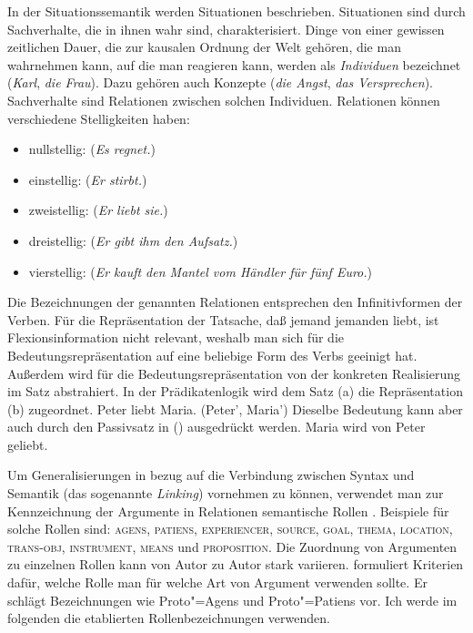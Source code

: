 In der Situationssemantik werden Situationen beschrieben.
Situationen sind durch Sachverhalte, die in ihnen wahr sind, charakterisiert.
Dinge von einer gewissen zeitlichen Dauer, die zur kausalen Ordnung der
Welt gehören, die man wahrnehmen kann, auf die man reagieren kann,
werden als \emph{Individuen} bezeichnet (\emph{Karl}, \emph{die Frau}).
Dazu gehören auch Konzepte (\emph{die Angst}, \emph{das Versprechen}).
Sachverhalte sind Relationen zwischen solchen Individuen.
Relationen können verschiedene Stelligkeiten haben:
\begin{itemize}
\item nullstellig:  (\emph{Es regnet.}) 
\item einstellig:  (\emph{Er stirbt.})
\item zweistellig:   (\emph{Er liebt sie.})
\item dreistellig:    (\emph{Er gibt ihm den Aufsatz.})
\item vierstellig:   (\emph{Er kauft den Mantel vom Händler für fünf Euro.})
\end{itemize}
Die Bezeichnungen der genannten Relationen entsprechen den Infinitivformen
der Verben. Für die Repräsentation der Tatsache, daß jemand jemanden liebt,
ist Flexionsinformation nicht relevant, weshalb man sich für die Bedeutungsrepräsentation
auf eine beliebige Form des Verbs geeinigt hat. Außerdem wird für die Bedeutungsrepräsentation
von der konkreten Realisierung im Satz abstrahiert. In der Prädikatenlogik wird
\zb dem Satz (a) die Repräsentation (b) zugeordnet.
\eal
\ex Peter liebt Maria.
\ex {}(Peter', Maria')
\zl
Dieselbe Bedeutung kann aber auch durch den Passivsatz in () ausgedrückt werden.
\ea
Maria wird von Peter geliebt.
\z

\noindent
Um Generalisierungen in bezug auf die Verbindung zwischen Syntax und Semantik (das sogenannte
\emph{Linking}) vornehmen zu können, verwendet man zur Kennzeichnung der Argumente
in Relationen semantische Rollen \citep{Fillmore68,Fillmore77,Kunze91}. Beispiele für
solche Rollen sind: 
\textsc{agens}, 
\textsc{patiens}, 
\textsc{experiencer}, 
\textsc{source}, 
\textsc{goal}, 
\textsc{thema}, 
\textsc{location}, 
\textsc{trans-obj}, 
\textsc{instrument}, 
\textsc{means} und 
\textsc{proposition}.
Die Zuordnung von Argumenten zu einzelnen Rollen kann von Autor zu Autor stark variieren.
\citet{Dowty91a} formuliert Kriterien dafür, welche Rolle man für welche Art von Argument
verwenden sollte. Er schlägt Bezeichnungen wie Proto"=Agens und Proto"=Patiens vor.
Ich werde im folgenden die etablierten Rollenbezeichnungen verwenden.

